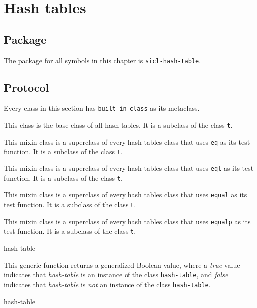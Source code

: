 \chapter{Hash tables}

\section{Package}

The package for all symbols in this chapter is \texttt{sicl-hash-table}.

\section{Protocol}

Every class in this section has \texttt{built-in-class} as its
metaclass.


This class is the base class of all hash tables.  It is a subclass of
the class \texttt{t}.


This mixin class is a superclass of every hash tables class that uses
\texttt{eq} as its test function.  It is a subclass of the class
\texttt{t}.


This mixin class is a superclass of every hash tables class that uses
\texttt{eql} as its test function.  It is a subclass of the class
\texttt{t}.


This mixin class is a superclass of every hash tables class that uses
\texttt{equal} as its test function.  It is a subclass of the class
\texttt{t}.


This mixin class is a superclass of every hash tables class that uses
\texttt{equalp} as its test function.  It is a subclass of the class
\texttt{t}.

{\small{} {hash-table}
}

This generic function returns a generalized Boolean value, where a
\textsl{true} value indicates that \textit{hash-table} is an instance
of the class \texttt{hash-table}, and \textsl{false} indicates that
\textit{hash-table} is \emph{not} an instance of the class
\texttt{hash-table}.

{\small{} {hash-table}
}

